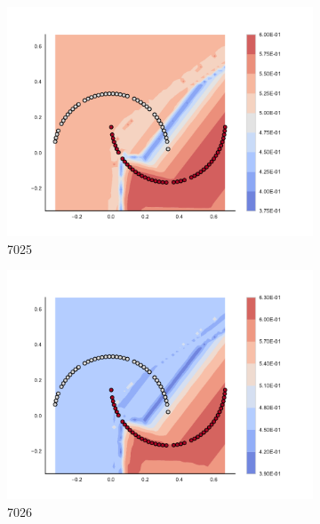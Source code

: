 \begin{figure}[h]
\begin{subfigure}[b]{0.09\textwidth}
    \includegraphics[clip, trim=2.35cm 1.75cm 4.5cm 0cm,width=\textwidth]{img/convergence/7025.pdf}
    \caption{7025}
    \label{fig:convergence_7025}
\end{subfigure}
%
\begin{subfigure}[b]{0.09\textwidth}
    \includegraphics[clip, trim=2.35cm 1.75cm 4.5cm 0cm,width=\textwidth]{img/convergence/7026.pdf}
    \caption{7026}
    \label{fig:convergence_7026}
\end{subfigure}
%
\begin{subfigure}[b]{0.09\textwidth}

\end{subfigure}
\end{figure}

